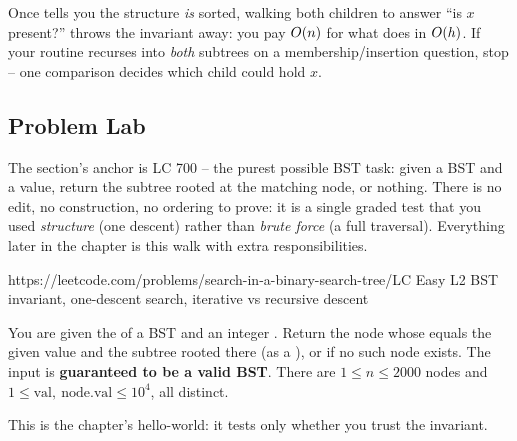 \begin{warningbox}
Once  tells you the structure \emph{is} sorted, walking both children to answer
``is $x$ present?'' throws the invariant away: you pay $O(n)$ for what 
does in $O(h)$. If your routine recurses into \emph{both} subtrees on a membership/insertion
question, stop -- one comparison decides which child could hold $x$.
\end{warningbox}

\subsection{Problem Lab}

The section's anchor is LC 700 -- the purest possible BST task: given a BST and a value, return the
subtree rooted at the matching node, or nothing. There is no edit, no construction, no ordering to
prove: it is a single graded test that you used \emph{structure} (one descent) rather than
\emph{brute force} (a full traversal). Everything later in the chapter is this walk with extra
responsibilities.

  {https://leetcode.com/problems/search-in-a-binary-search-tree/}{LC Easy L2}
  {BST invariant, one-descent search, iterative vs recursive descent}

\begin{problemstatement}
You are given the  of a BST and an integer . Return the node whose
 equals the given value and the subtree rooted there (as a ), or
 if no such node exists. The input is \textbf{guaranteed to be a valid BST}. There are
$1\le n\le 2000$ nodes and $1\le \text{val},\ \text{node.val}\le 10^{4}$, all distinct.
\end{problemstatement}

\begin{attemptgate}
This is the chapter's hello-world: it tests only whether you trust the invariant.
\end{attemptgate}

